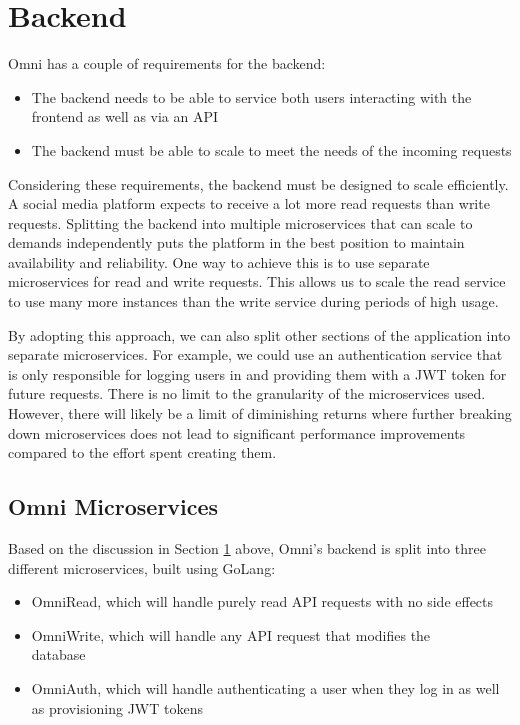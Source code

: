 \section{Backend}
\label{sec:design-system-backend}
Omni has a couple of requirements for the backend:
\begin{itemize}
    \item The backend needs to be able to service both users interacting with the frontend as well as via an API
    \item The backend must be able to scale to meet the needs of the incoming requests
\end{itemize}
Considering these requirements, the backend must be designed to scale efficiently. A social media platform expects to receive a lot more read requests than write requests.
Splitting the backend into multiple microservices that can scale to demands independently puts the platform in the best position to maintain availability and reliability. 
One way to achieve this is to use separate microservices for read and write requests. This allows us to scale the read service to use many more instances than the write service during periods of high usage. 

By adopting this approach, we can also split other sections of the application into separate microservices.
For example, we could use an authentication service that is only responsible for logging users in and providing them with a JWT token for future requests.
There is no limit to the granularity of the microservices used.
However, there will likely be a limit of diminishing returns where further breaking down microservices does not lead to significant performance improvements compared to the effort spent creating them.

\subsection{Omni Microservices}
\label{sec:design-system-backend-microservices}
Based on the discussion in Section \ref{sec:design-system-backend} above, Omni's backend is split into three different microservices, built using GoLang:
\begin{itemize}
    \item OmniRead, which will handle purely read API requests with no side effects
    \item OmniWrite, which will handle any API request that modifies the \\database
    \item OmniAuth, which will handle authenticating a user when they log in as well as provisioning JWT tokens
\end{itemize}

